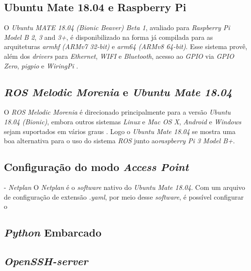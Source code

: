  \pagebreak
 
\subsection{Ubuntu Mate 18.04 e Raspberry Pi}
O \textit{Ubuntu MATE 18.04 (Bionic Beaver) Beta 1}, avaliado para \textit{Raspberry Pi Model B 2}, \textit{3} and \textit{3+}, é disponibilizado na forma já compilada para as arquiteturas \textit{armhf (ARMv7 32-bit)} e \textit{arm64 (ARMv8 64-bit)}.
Esse sistema provê, além dos \textit{drivers} para \textit{Ethernet}, \textit{WIFI} e \textit{Bluetooth}, acesso ao \textit{GPIO} via \textit{GPIO Zero}, \textit{pigpio} e \textit{WiringPi} \cite{wimpress2019}.   

\subsection{\textit{ROS Melodic Morenia} e \textit{Ubuntu Mate 18.04}}

O \textit{ROS Melodic Morenia} é direcionado principalmente para a versão \textit{Ubuntu 18.04 (Bionic)}, embora outros sistemas \textit{Linux} e \textit{Mac OS X}, \textit{Android} e \textit{Windows} sejam suportados em vários graus \cite{rosmelodic2019}.
Logo o \textit{Ubuntu Mate 18.04} se mostra uma boa alternativa para o uso do sistema \textit{ROS} junto ao\textit{raspberry Pi 3 Model B+}.

\subsection{Configuração do modo \textit{Access Point}} - \textit{Netplan}
O \textit{Netplan} é o \textit{software} nativo do \textit{Ubuntu Mate 18.04}.
Com um arquivo de configuração de extensão \textit{.yaml}, por meio desse \textit{software}, é possível configurar o  

\subsection{\textit{Python} Embarcado}

\subsection{\textit{OpenSSH-server}}

\pagebreak

